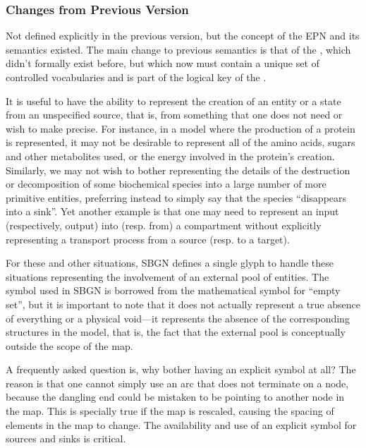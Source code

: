 \subsubsection{Changes from Previous Version}

Not defined explicitly in the previous version, but the concept of the
EPN and its semantics existed. The main change to previous semantics
is that of the , which didn't formally exist before,
but which now must contain a unique set of controlled vocabularies and
is part of the logical key of the .

\label{sec:techref:sourceSink}
\label{defn:emptySet}

It is useful to have the ability to represent the creation of an entity or
a state from an unspecified source, that is, from something that one does
not need or wish to make precise.  For instance, in a model where the
production of a protein is represented, it may not be desirable to
represent all of the amino acids, sugars and other metabolites used, or the
energy involved in the protein's creation.  Similarly, we may not wish to
bother representing the details of the destruction or decomposition of some
biochemical species into a large number of more primitive entities,
preferring instead to simply say that the species ``disappears into a
sink''.  Yet another example is that one may need to represent an input
(respectively, output) into (resp. from) a compartment without explicitly
representing a transport process from a source (resp. to a target).

For these and other situations, SBGN defines a single glyph to handle
these situations representing the involvement of an external pool of
entities.  The symbol used in SBGN is borrowed from the mathematical
symbol for ``empty set'', but it is important to note that it does not
actually represent a true absence of everything or a physical
void---it represents the absence of the corresponding structures in
the model, that is, the fact that the external pool is conceptually
outside the scope of the map.

A frequently asked question is, why bother having an explicit symbol at
all?  The reason is that one cannot simply use an arc that does not
terminate on a node, because the dangling end could be mistaken to be
pointing to another node in the map.  This is specially true if the
map is rescaled, causing the spacing of elements in the map to
change.  The availability and use of an explicit symbol for sources and
sinks is critical.

